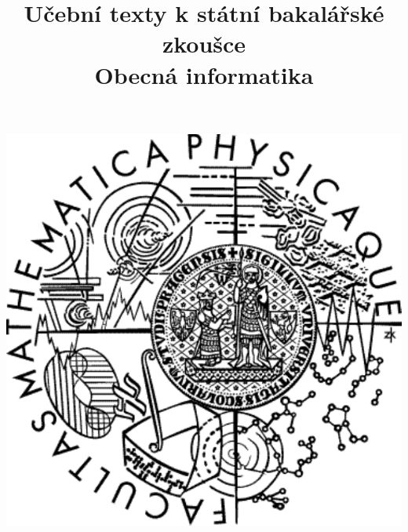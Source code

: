 \clearpage

\clearpage

\title{\LARGE Učební texty k státní bakalářské zkoušce \\ Obecná informatika}




\maketitle

\vspace{10mm}
\begin{center}
\includegraphics[scale=0.5]{common/logo.pdf}
\end{center} 

\clearpage

\clearpage

\tableofcontents

\newpage

